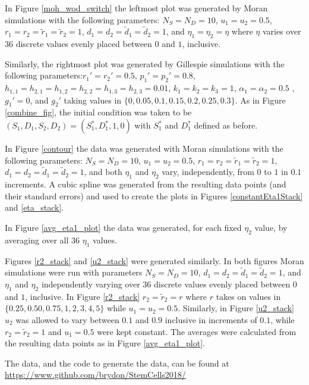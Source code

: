 \documentclass[12pt]{article}
\begin{document}
\begin{appendices}

In Figure \ref{moh_wod_switch} the leftmost plot was generated by Moran simulations with the following parameters: $N_S=N_D=10$, $u_1=u_2=0.5$, $r_1=r_2=\tilde{r}_1=\tilde{r}_2=1$, $d_1=d_2=\tilde{d}_1=\tilde{d}_2=1$, and $\eta_1=\eta_2=\eta$ where $\eta$ varies over 36 discrete values evenly placed between $0$ and $1$, inclusive.

Similarly, the rightmost plot was generated by Gillespie simulations with the following parameters:$r_1'=r_2'=0.5$, $p_1'=p_2'=0.8$, $h_{1,1}=h_{2,1}=h_{1,2}=h_{2,2}=h_{1,3}=h_{2,3}=0.01$, $k_1=k_2=k_3=1$, $\alpha_1=\alpha_2=0.5$
, $g_1'=0$, and $g_2'$ taking values in $\{0, 0.05, 0.1, 0.15, 0.2, 0.25, 0.3\}$. As in Figure \ref{combine_fig}, the initial condition was taken to be $(S_1, D_1, S_2, D_2)=(S_1^\ast, D_1^\ast, 1, 0)$ with $S_1^\ast$ and $D_1^\ast$ defined as before.

In Figure \ref{contour} the data was generated with Moran simulations with the following parameters:  $N_S=N_D=10$, $u_1=u_2=0.5$, $r_1=r_2=\tilde{r}_1=\tilde{r}_2=1$, $d_1=d_2=\tilde{d}_1=\tilde{d}_2=1$, and both $\eta_1$ and $\eta_2$ vary, independently, from $0$ to $1$ in $0.1$ increments. A cubic spline was generated from the resulting data points (and their standard errors) and used to create the plots in Figures \ref{constantEta1Stack} and \ref{eta_stack}.

In Figure \ref{avg_eta1_plot} the data was generated, for each fixed $\eta_2$ value, by averaging over all 36 $\eta_1$ values.

Figures \ref{r2_stack} and \ref{u2_stack} were generated similarly. In both figures Moran simulations were run with parameters $N_S=N_D=10$, $d_1=d_2=\tilde{d}_1=\tilde{d}_2=1$, and $\eta_1$ and $\eta_2$ independently varying over 36 discrete values evenly placed between $0$ and $1$, inclusive. In Figure \ref{r2_stack} $r_2=\tilde{r}_2=r$ where $r$ takes on values in $\{0.25, 0.50, 0.75, 1, 2, 3, 4, 5\}$ while $u_1=u_2=0.5$. Similarly, in Figure \ref{u2_stack} $u_2$ was allowed to vary between $0.1$ and $0.9$ inclusive in increments of $0.1$, while $r_2=\tilde{r}_2=1$ and $u_1=0.5$ were kept constant. The averages were calculated from the resulting data points as in Figure \ref{avg_eta1_plot}.

The data, and the code to generate the data, can be found at \url{https://www.github.com/brydon/StemCells2018/}

\end{appendices}



\end{document}
